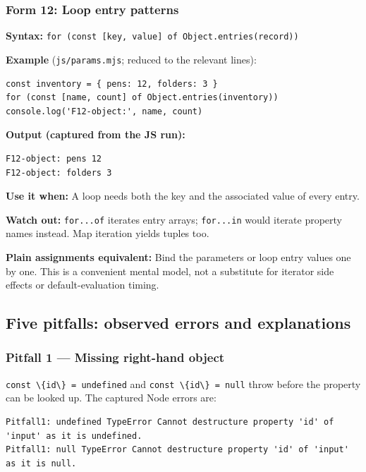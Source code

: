 \documentclass[
  10pt,
]{article}
\newcommand{\passthrough}[1]{#1}
\begin{document}
\subsubsection{Form 12: Loop entry
patterns}\label{form-12-loop-entry-patterns}

\textbf{Syntax:}
\passthrough{\lstinline!for (const [key, value] of Object.entries(record))!}

\textbf{Example} (\passthrough{\lstinline!js/params.mjs!}; reduced to
the relevant lines):

\begin{lstlisting}
const inventory = { pens: 12, folders: 3 }
for (const [name, count] of Object.entries(inventory)) console.log('F12-object:', name, count)
\end{lstlisting}

\textbf{Output (captured from the JS run):}

\begin{lstlisting}
F12-object: pens 12
F12-object: folders 3
\end{lstlisting}

\textbf{Use it when:} A loop needs both the key and the associated value
of every entry.

\textbf{Watch out:} \passthrough{\lstinline!for...of!} iterates entry
arrays; \passthrough{\lstinline!for...in!} would iterate property names
instead. Map iteration yields tuples too.

\textbf{Plain assignments equivalent:} Bind the parameters or loop entry
values one by one. This is a convenient mental model, not a substitute
for iterator side effects or default-evaluation timing.

\subsection{Five pitfalls: observed errors and
explanations}\label{five-pitfalls-observed-errors-and-explanations}

\subsubsection{Pitfall 1 --- Missing right-hand
object}\label{pitfall-1-missing-right-hand-object}

\passthrough{\lstinline!const \{id\} = undefined!} and
\passthrough{\lstinline!const \{id\} = null!} throw before the property
can be looked up. The captured Node errors are:

\begin{lstlisting}
Pitfall1: undefined TypeError Cannot destructure property 'id' of 'input' as it is undefined.
Pitfall1: null TypeError Cannot destructure property 'id' of 'input' as it is null.
\end{lstlisting}
\end{document}

